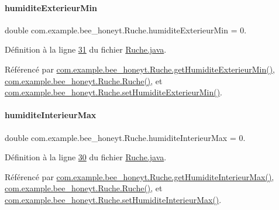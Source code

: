 \paragraph{\texorpdfstring{humidite\+Exterieur\+Min}{humiditeExterieurMin}}
{\footnotesize\ttfamily double com.\+example.\+bee\+\_\+honeyt.\+Ruche.\+humidite\+Exterieur\+Min = 0.\hspace{0.3cm}{\ttfamily [private]}}



Définition à la ligne \hyperlink{_ruche_8java_source_l00031}{31} du fichier \hyperlink{_ruche_8java_source}{Ruche.\+java}.



Référencé par \hyperlink{_ruche_8java_source_l00189}{com.\+example.\+bee\+\_\+honeyt.\+Ruche.\+get\+Humidite\+Exterieur\+Min()}, \hyperlink{_ruche_8java_source_l00044}{com.\+example.\+bee\+\_\+honeyt.\+Ruche.\+Ruche()}, et \hyperlink{_ruche_8java_source_l00194}{com.\+example.\+bee\+\_\+honeyt.\+Ruche.\+set\+Humidite\+Exterieur\+Min()}.

\mbox{\label{classcom_1_1example_1_1bee__honeyt_1_1_ruche_a1483266a1f1ba7d83e0f69bef8e26231}} 
\paragraph{\texorpdfstring{humidite\+Interieur\+Max}{humiditeInterieurMax}}
{\footnotesize\ttfamily double com.\+example.\+bee\+\_\+honeyt.\+Ruche.\+humidite\+Interieur\+Max = 0.\hspace{0.3cm}{\ttfamily [private]}}



Définition à la ligne \hyperlink{_ruche_8java_source_l00030}{30} du fichier \hyperlink{_ruche_8java_source}{Ruche.\+java}.



Référencé par \hyperlink{_ruche_8java_source_l00179}{com.\+example.\+bee\+\_\+honeyt.\+Ruche.\+get\+Humidite\+Interieur\+Max()}, \hyperlink{_ruche_8java_source_l00044}{com.\+example.\+bee\+\_\+honeyt.\+Ruche.\+Ruche()}, et \hyperlink{_ruche_8java_source_l00184}{com.\+example.\+bee\+\_\+honeyt.\+Ruche.\+set\+Humidite\+Interieur\+Max()}.

